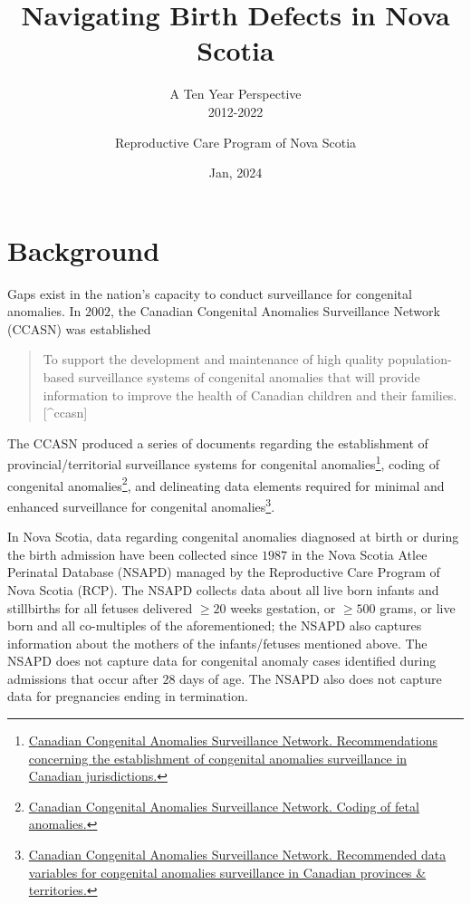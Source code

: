 \documentclass[
]{krantz}
\title{Navigating Birth Defects in Nova Scotia}
\subtitle{A Ten Year Perspective\\
2012-2022}
\author{Reproductive Care Program of Nova Scotia}
\date{Jan, 2024}
\begin{document}
\pagestyle{empty}

\setcounter{page}{1}
\maketitle
\thispagestyle{empty}
\newpage


{
\hypersetup{linkcolor=}
\setcounter{tocdepth}{3}
\tableofcontents
\newpage
}


\hypertarget{background}{%
\chapter*{Background}\label{background}}


Gaps exist in the nation's capacity to conduct surveillance for congenital anomalies. In \(2002\), the Canadian Congenital Anomalies Surveillance Network (CCASN) was established

\begin{quote}
To support the development and maintenance of high quality population-based surveillance systems of congenital anomalies that will provide information to improve the health of Canadian children and their families.{[}\^{}ccasn{]}
\end{quote}

The CCASN produced a series of documents regarding the establishment of provincial/territorial surveillance systems for congenital anomalies\footnote{\href{https://www.canada.ca/en/public-health/services/health-promotion/what-is-ccasn/guidelines.html}{Canadian Congenital Anomalies Surveillance Network. Recommendations concerning the establishment of congenital anomalies surveillance in Canadian jurisdictions.}}, coding of congenital anomalies\footnote{\href{https://health-infobase.canada.ca/congenital-anomalies/}{Canadian Congenital Anomalies Surveillance Network. Coding of fetal anomalies.}}, and delineating data elements required for minimal and enhanced surveillance for congenital anomalies\footnote{\href{https://www.phac-aspc.gc.ca/ccasn-rcsac/sac-cas/pdf/cas-eng.pdf}{Canadian Congenital Anomalies Surveillance Network. Recommended data variables for congenital anomalies surveillance in Canadian provinces \& territories.}}.

In Nova Scotia, data regarding congenital anomalies diagnosed at birth or during the birth admission have been collected since \(1987\) in the Nova Scotia Atlee Perinatal Database (NSAPD) managed by the Reproductive Care Program of Nova Scotia (RCP). The NSAPD collects data about all live born infants and stillbirths for all fetuses delivered \(\ge 20\) weeks gestation, or \(\ge 500\) grams, or live born and all co-multiples of the aforementioned; the NSAPD also captures information about the mothers of the infants/fetuses mentioned above. The NSAPD does not capture data for congenital anomaly cases identified during admissions that occur after \(28\) days of age. The NSAPD also does not capture data for pregnancies ending in termination.
\end{document}
